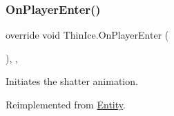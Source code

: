 \subsubsection{\texorpdfstring{On\+Player\+Enter()}{OnPlayerEnter()}}
{\footnotesize\ttfamily override void Thin\+Ice.\+On\+Player\+Enter (\begin{DoxyParamCaption}{ }\end{DoxyParamCaption})\hspace{0.3cm}{\ttfamily [inline]}, {\ttfamily [protected]}, {\ttfamily [virtual]}}



Initiates the shatter animation. 



Reimplemented from \mbox{\hyperlink{class_entity_ad1e2bb09e463c33b64b26ba3306ba2d7}{Entity}}.

